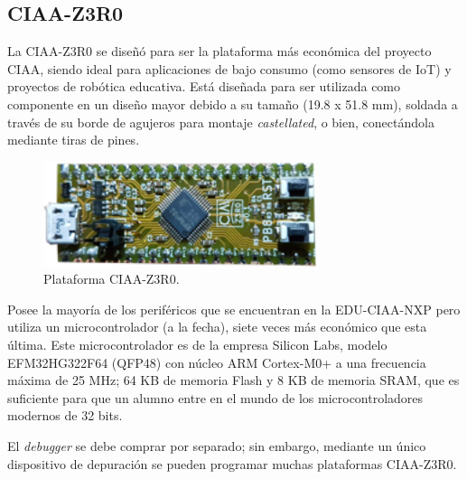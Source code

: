 
\subsection{CIAA-Z3R0}
\label{sec:CIAA-Z3R0}

La CIAA-Z3R0 se diseñó para ser la plataforma más económica del proyecto CIAA, siendo ideal para aplicaciones de bajo consumo (como sensores de IoT) y proyectos de robótica educativa. Está diseñada para ser utilizada como componente en un diseño mayor debido a su tamaño (19.8 x 51.8 mm), soldada a través de su borde de agujeros para montaje \emph{castellated}, o bien, conectándola mediante tiras de pines.

\begin{figure}[!htbp]
\begin{center}  %
\includegraphics*[width=8cm]{Figures/CIAA-Z3R0_Foto.png}
\par\caption{Plataforma CIAA-Z3R0.}\label{fig:ciaaZero}
\end{center}
\end{figure}

Posee la mayoría de los periféricos que se encuentran en la EDU-CIAA-NXP pero utiliza un microcontrolador (a la fecha), siete veces más económico que esta última. Este microcontrolador es de la empresa Silicon Labs, modelo EFM32HG322F64 (QFP48) \citep{EFM32HG322F64} con núcleo ARM Cortex-M0+ a una frecuencia máxima de 25 MHz; 64 KB de memoria Flash y 8 KB de memoria SRAM, que es suficiente para que un alumno entre en el mundo de los microcontroladores modernos de 32 bits.

El \emph{debugger} se debe comprar por separado; sin embargo, mediante un único dispositivo de depuración se pueden programar muchas plataformas CIAA-Z3R0.


